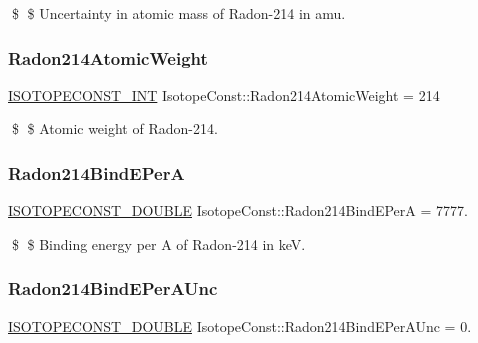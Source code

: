 \$ \$ Uncertainty in atomic mass of Radon-\/214 in amu. \mbox{\label{group___isotope_const-_radon-_rn214_gaa73e996eef0173f4549a6b8cb3f03266}} 
\subsubsection{\texorpdfstring{Radon214\+Atomic\+Weight}{Radon214AtomicWeight}}
{\footnotesize\ttfamily \mbox{\hyperlink{group___isotope_const-_macros_ga5f18360b3e99483a35c32d789e62621c}{I\+S\+O\+T\+O\+P\+E\+C\+O\+N\+S\+T\+\_\+\+I\+NT}} Isotope\+Const\+::\+Radon214\+Atomic\+Weight = 214}

\$ \$ Atomic weight of Radon-\/214. \mbox{\label{group___isotope_const-_radon-_rn214_ga91b4aca0da15f56854d87e3dc9942e4b}} 
\subsubsection{\texorpdfstring{Radon214\+Bind\+E\+PerA}{Radon214BindEPerA}}
{\footnotesize\ttfamily \mbox{\hyperlink{group___isotope_const-_macros_ga8f45a7272ce02c0b4c65c44636ed719a}{I\+S\+O\+T\+O\+P\+E\+C\+O\+N\+S\+T\+\_\+\+D\+O\+U\+B\+LE}} Isotope\+Const\+::\+Radon214\+Bind\+E\+PerA = 7777.}

\$ \$ Binding energy per A of Radon-\/214 in keV. \mbox{\label{group___isotope_const-_radon-_rn214_ga15d3c7019625a4a1750cae24048a65fa}} 
\subsubsection{\texorpdfstring{Radon214\+Bind\+E\+Per\+A\+Unc}{Radon214BindEPerAUnc}}
{\footnotesize\ttfamily \mbox{\hyperlink{group___isotope_const-_macros_ga8f45a7272ce02c0b4c65c44636ed719a}{I\+S\+O\+T\+O\+P\+E\+C\+O\+N\+S\+T\+\_\+\+D\+O\+U\+B\+LE}} Isotope\+Const\+::\+Radon214\+Bind\+E\+Per\+A\+Unc = 0.}

